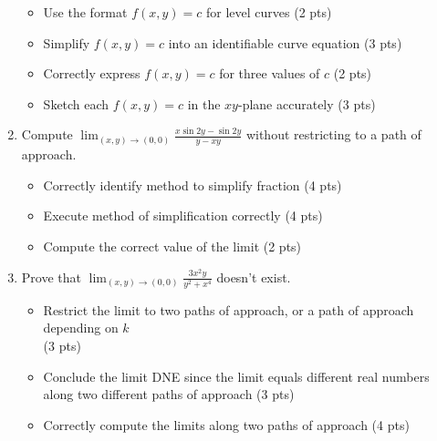 \documentclass[12pt]{article}
\newcommand{\liner}{\noindent\underline{\hspace*{7in}}}
\newcommand{\ds}{\displaystyle}
\begin{document}
\begin{enumerate}
  \begin{itemize}
    \item Use the format $f(x,y)=c$ for level curves (2 pts)
    \item Simplify $f(x,y)=c$ into an identifiable curve equation (3 pts)
    \item Correctly express $f(x,y)=c$ for three values of $c$ (2 pts)
    \item Sketch each $f(x,y)=c$ in the $xy$-plane accurately (3 pts)
  \end{itemize}

\vspace*{7.6in}

\liner

\newpage


\item Compute $\ds \lim_{(x,y)\to(0,0)} \frac{x\sin 2y - \sin 2y}{y-xy}$ without restricting to a path of approach.

  \begin{itemize}
    \item Correctly identify method to simplify fraction (4 pts)
    \item Execute method of simplification correctly (4 pts)
    \item Compute the correct value of the limit (2 pts)
  \end{itemize}

\vspace*{7in}

\liner

\newpage


\item Prove that $\ds \lim_{(x,y)\to(0,0)} \frac{3x^2y}{y^2+x^4}$ doesn't exist.

  \begin{itemize}
    \item Restrict the limit to two paths of approach, or a path of approach depending on $k$ \\ (3 pts)
    \item Conclude the limit DNE since the limit equals different real numbers along two different paths of approach (3 pts)
    \item Correctly compute the limits along two paths of approach (4 pts)
  \end{itemize}

\vspace*{7in}


\end{enumerate}
\end{document}
